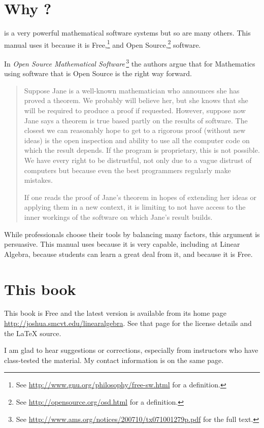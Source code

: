 \section{Why \Sage?}
\Sage{} is a very powerful mathematical software systems but so are
many others.
This manual uses it because it is 
Free,\footnote{See \protect\url{http://www.gnu.org/philosophy/free-sw.html} for a definition.} 
and Open Source,\footnote{See \protect\url{http://opensource.org/osd.html} for a definition.} software.

In 
\textit{Open Source Mathematical Software\,}\citep{JoynerStein07}\footnote{See \protect\url{http://www.ams.org/notices/200710/tx071001279p.pdf} for the full text.}
the authors argue that for Mathematics using software that is Open Source
is the right way forward.

\begin{quotation}\small
Suppose Jane is a well-known mathematician who announces
she has proved a theorem. We probably will believe
her, but she knows that she will be required to produce
a proof if requested. However, suppose now Jane says a
theorem is true based partly on the results of software. The
closest we can reasonably hope to get to a rigorous proof
(without new ideas) is the open inspection and ability to use
all the computer code on which the result depends. If the
program is proprietary, this is not possible. We have every
right to be distrustful, not only due to a vague distrust of
computers but because even the best programmers regularly
make mistakes.

If one reads the proof of Jane’s theorem in hopes of
extending her ideas or applying them in a new context, it
is limiting to not have access to the inner workings of the
software on which Jane’s result builds.
\end{quotation}  
While professionals choose their tools by balancing many factors,
this argument is persuasive.
This manual uses \Sage{} because it is very capable, 
including at Linear Algebra, because students can 
learn a great deal from it,
and because it is Free.


\section{This book}
This book is Free and
the latest version is available from its home page 
\url{http://joshua.smcvt.edu/linearalgebra}.
See that page for the license details and the \LaTeX{} source.

I am glad to hear suggestions or corrections, especially from instructors
who have class-tested the material.
My contact information is on the same page. 



